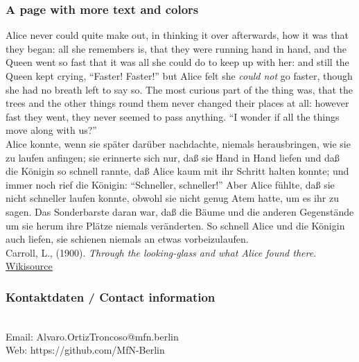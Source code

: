 {\scriptsize
\begin{frame}
  \frametitle{A page with more text and colors}
  Alice never could quite make out, in thinking it over afterwards, how it was that they began: all she remembers is, that they were running hand in hand, and the Queen went so fast that it was all she could do to keep up with her: and still the Queen kept crying, ``Faster! Faster!'' but Alice felt she \textit{could not} go faster, though she had no breath left to say so.
  The most curious part of the thing was, that the trees and the other things round them never changed their places at all: however fast they went, they never seemed to pass anything. ``I wonder if all the things move along with us?''\\
    \bigskip
    \textcolor{mfn_green}{Alice konnte, wenn sie später darüber nachdachte, niemals herausbringen, wie sie zu laufen anfingen; sie erinnerte sich nur, daß sie Hand in Hand liefen und daß die Königin so schnell rannte, daß Alice kaum mit ihr Schritt halten konnte; und immer noch rief die Königin: ``Schneller, schneller!'' Aber Alice fühlte, daß sie nicht schneller laufen konnte, obwohl sie nicht genug Atem hatte, um es ihr zu sagen.
      Das Sonderbarste daran war, daß die Bäume und die anderen Gegenstände um sie herum ihre Plätze niemals veränderten. So schnell Alice und die Königin auch liefen, sie schienen niemals an etwas vorbeizulaufen.}\\
  \bigskip
  \scriptsize{Carroll, L., (1900). \textit{Through the looking-glass and what Alice found there}. \href{https://en.wikisource.org/wiki/Through_the_Looking-Glass,_and_What_Alice_Found_There/Chapter_II}{\color{mfn_blue}Wikisource}}  
\end{frame}
}

\begin{frame}
  \frametitle{Kontaktdaten / \textcolor{mfn_green}{Contact information}}
  \begin{center}
    \insertauthor \\
    \medskip
    Email: Alvaro.OrtizTroncoso@mfn.berlin \\    
    \medskip
    Web: https://github.com/MfN-Berlin
  \end{center}
\end{frame}




